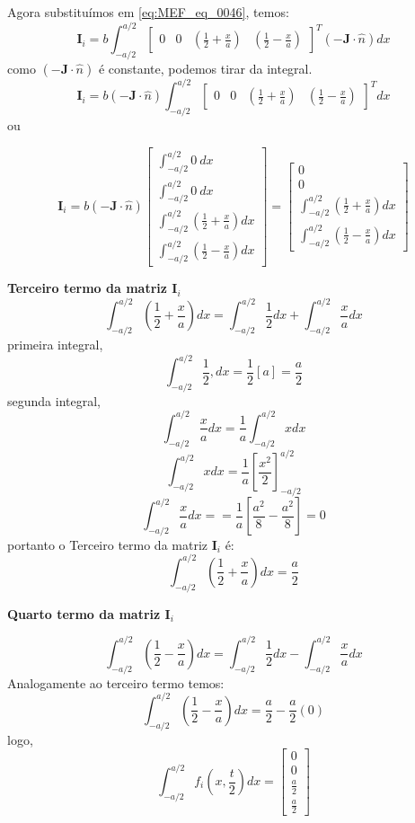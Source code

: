 \documentclass[
12pt,
a4paper,
oneside,
chapter=TITLE,
sumario=tradicional
]{abntex2}
\begin{document}
Agora substituímos em \ref{eq:MEF_eq_0046}, temos:
$$  
\mathbf{I}_i = b \int_{-a/2}^{a/2}  
\begin{bmatrix}  
	0&  
	0&  
	(\frac{1}{2}+\frac{x}{a})&  
	(\frac{1}{2}-\frac{x}{a}) 
\end{bmatrix}^{T} (-\mathbf{J}\cdot\hat{n})  
dx  
$$
como $(-\mathbf{J}\cdot\hat{n})$ é constante, podemos tirar da integral.
$$  
\mathbf{I}_i = b (-\mathbf{J}\cdot\hat{n})  \int_{-a/2}^{a/2}  
\begin{bmatrix}  
	0&  
	0&  
	(\frac{1}{2}+\frac{x}{a})&  
	(\frac{1}{2}-\frac{x}{a}) 
\end{bmatrix}^{T} 
dx  
$$
ou

$$  
\mathbf{I}_i = b(-\mathbf{J}\cdot\hat{n})  
\begin{bmatrix}  
	\int_{-a/2}^{a/2}0 \: dx \\  
	\int_{-a/2}^{a/2}0 \: dx \\  
	\int_{-a/2}^{a/2}\left(\frac{1}{2}+\frac{x}{a}\right) dx \\ 
	\int_{-a/2}^{a/2}\left(\frac{1}{2}-\frac{x}{a}\right) dx  
\end{bmatrix} =
\begin{bmatrix}  
	0 \\  
	0 \\  
	\int_{-a/2}^{a/2}\left(\frac{1}{2}+\frac{x}{a}\right) dx \\ 
	\int_{-a/2}^{a/2}\left(\frac{1}{2}-\frac{x}{a}\right) dx  
\end{bmatrix}  
$$

\textbf{Terceiro termo da matriz $\mathbf{I}_i$}
$$  
\int_{-a/2}^{a/2}\left(\frac{1}{2}+\frac{x}{a}\right) dx =
\int_{-a/2}^{a/2}\frac{1}{2} dx  
+  
\int_{-a/2}^{a/2}\frac{x}{a} dx  
$$
primeira integral,
$$  
\int_{-a/2}^{a/2}\frac{1}{2},dx
= \frac{1}{2}\left[a\right]
=
\frac{a}{2}  
$$
segunda integral,
 $$\int_{-a/2}^{a/2}\frac{x}{a} dx= \frac{1}{a}\int_{-a/2}^{a/2}x dx $$
$$  
\int_{-a/2}^{a/2} xdx
= \frac{1}{a}
\left[\frac{x^2}{2}\right]_{-a/2}^{a/2}  
$$
$$
\int_{-a/2}^{a/2}\frac{x}{a} dx= 
= \frac{1}{a}\left[\frac{a^2}{8}-\frac{a^2}{8}\right]
=
0  
$$
portanto o Terceiro termo da matriz $\mathbf{I}_i$ é:
$$  
\int_{-a/2}^{a/2}\left(\frac{1}{2}+\frac{x}{a}\right) dx = \frac{a}{2}
$$

\textbf{Quarto termo da matriz $\mathbf{I}_i$}

$$  
\int_{-a/2}^{a/2}\left(\frac{1}{2}-\frac{x}{a}\right)dx
= \int_{-a/2}^{a/2}\frac{1}{2}dx-
\int_{-a/2}^{a/2}\frac{x}{a}dx  
$$
Analogamente ao terceiro termo temos:
$$
\int_{-a/2}^{a/2}\left(\frac{1}{2}-\frac{x}{a}\right)dx = 
\frac{a}{2} - \frac{a}{2} (0)  
$$
logo,
 $$  
\int_{-a/2}^{a/2} f_i(x,\frac{t}{2}) dx =
\begin{bmatrix}  
	0\\  
	0\\  
	\frac{a}{2}\\  
	\frac{a}{2}  
\end{bmatrix}  
$$
\end{document}
